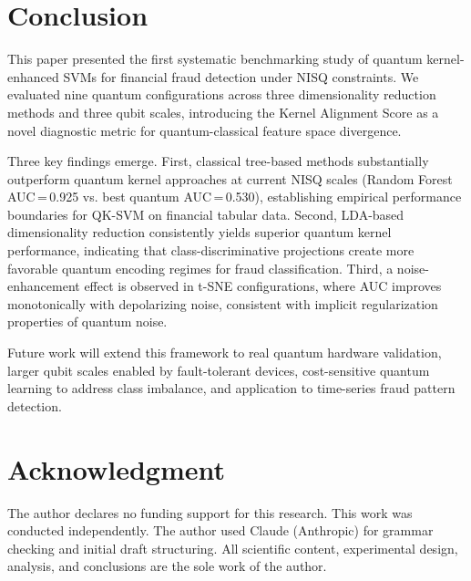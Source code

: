 \documentclass[journal]{IEEEtran}
\begin{document}
\section{Conclusion}
\label{sec:conclusion}

This paper presented the first systematic benchmarking study 
of quantum kernel-enhanced SVMs for financial fraud detection 
under NISQ constraints. We evaluated nine quantum configurations 
across three dimensionality reduction methods and three qubit 
scales, introducing the Kernel Alignment Score as a novel 
diagnostic metric for quantum-classical feature space divergence.

Three key findings emerge. First, classical tree-based methods 
substantially outperform quantum kernel approaches at current 
NISQ scales (Random Forest AUC\,=\,0.925 vs. best quantum 
AUC\,=\,0.530), establishing empirical performance boundaries 
for QK-SVM on financial tabular data. Second, LDA-based 
dimensionality reduction consistently yields superior quantum 
kernel performance, indicating that class-discriminative 
projections create more favorable quantum encoding regimes 
for fraud classification. Third, a noise-enhancement effect 
is observed in t-SNE configurations, where AUC improves 
monotonically with depolarizing noise, consistent with 
implicit regularization properties of quantum noise.

Future work will extend this framework to real quantum 
hardware validation, larger qubit scales enabled by 
fault-tolerant devices, cost-sensitive quantum learning 
to address class imbalance, and application to time-series 
fraud pattern detection.

\section*{Acknowledgment}
The author declares no funding support for this research. 
This work was conducted independently. The author used 
Claude (Anthropic) for grammar checking and initial 
draft structuring. All scientific content, experimental 
design, analysis, and conclusions are the sole work 
of the author.
\end{document}
